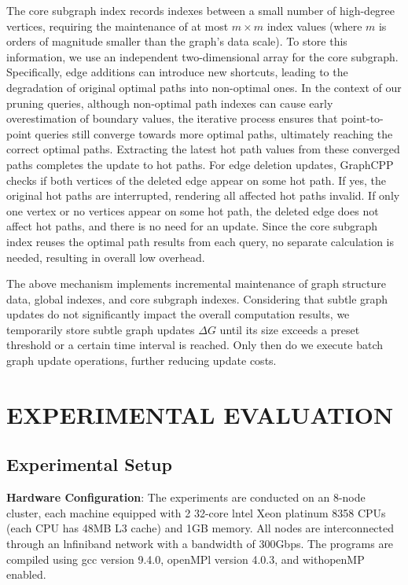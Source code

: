 \documentclass[lettersize,journal]{IEEEtran} %
\begin{document}
The core subgraph index records indexes between a small number of high-degree vertices, requiring the maintenance of at most $m \times m$ index values (where $m$ is orders of magnitude smaller than the graph's data scale). To store this information, we use an independent two-dimensional array for the core subgraph. Specifically, edge additions can introduce new shortcuts, leading to the degradation of original optimal paths into non-optimal ones. In the context of our pruning queries, although non-optimal path indexes can cause early overestimation of boundary values, the iterative process ensures that point-to-point queries still converge towards more optimal paths, ultimately reaching the correct optimal paths. Extracting the latest hot path values from these converged paths completes the update to hot paths. For edge deletion updates, GraphCPP checks if both vertices of the deleted edge appear on some hot path. If yes, the original hot paths are interrupted, rendering all affected hot paths invalid. If only one vertex or no vertices appear on some hot path, the deleted edge does not affect hot paths, and there is no need for an update. Since the core subgraph index reuses the optimal path results from each query, no separate calculation is needed, resulting in overall low overhead.

The above mechanism implements incremental maintenance of graph structure data, global indexes, and core subgraph indexes. Considering that subtle graph updates do not significantly impact the overall computation results, we temporarily store subtle graph updates $\Delta G$ until its size exceeds a preset threshold or a certain time interval is reached. Only then do we execute batch graph update operations, further reducing update costs.

\section{EXPERIMENTAL EVALUATION}
\subsection{Experimental Setup}

{\bf{Hardware Configuration}}: The experiments are conducted on an 8-node cluster, each machine equipped with 2 32-core lntel Xeon platinum 8358 CPUs (each CPU has 48MB L3 cache) and 1GB memory. All nodes are interconnected through an lnfiniband network with a bandwidth of 300Gbps. The programs are compiled using gcc version 9.4.0, openMPl version 4.0.3, and withopenMP enabled.
    
\end{document}
